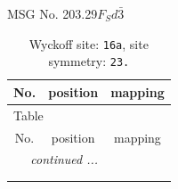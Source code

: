 \documentclass[fleqn,8pt]{jsarticle}
\begin{document}
\setcounter{MaxMatrixCols}{32}

\renewcommand{\tablename}{Table~}
\renewcommand{\figurename}{Figure~}
\begin{center}
\LARGE
MSG No. 203.29\quad$F_{S}d\bar{3}$
\end{center}
\renewcommand{\arraystretch}{1.2}
\begin{longtable}{ccc}
\caption{Wyckoff site: {\tt 16a}, site symmetry: {\tt 23.}}
 \\
 \hline \hline
No. & position & mapping \\ \hline \endfirsthead

\multicolumn{2}{l}{\tablename\ \thetable{}} \\
 \hline \hline
No. & position & mapping \\ \hline \endhead

 \hline \hline
\multicolumn{2}{r}{\footnotesize\it continued ...} \\ \endfoot

 \hline \hline
\multicolumn{2}{r}{} \\ \endlastfoot


\end{longtable}
\end{document}
